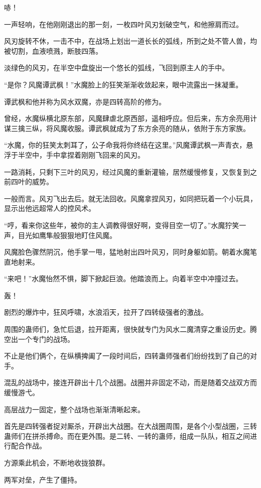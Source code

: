\begin{this_body}
哧！

一声轻响，在他刚刚退出的那一刻，一枚四叶风刃划破空气，和他擦肩而过。

风刃旋转不休，一击不中，在战场上划出一道长长的弧线，所到之处不管人兽，均被切割，血液喷溅，断肢四落。

淡绿色的风刃，在半空中盘旋出一个悠长的弧线，飞回到原主人的手中。

“是你？风魔谭武枫！”水魔脸上的狂笑渐渐收敛起来，眼中流露出一抹凝重。

谭武枫和他并称为风水双魔，亦是四转高阶的修为。

曾经，水魔纵横北原东部，风魔肆虐北原西部，遥相呼应。但后来，东方余亮用计谋三擒三纵，将风魔收服。谭武枫就成为了东方余亮的随从，依附于东方家族。

“水魔，你的狂笑太刺耳了，公子命我将你终结在这里。”风魔谭武枫一声青衣，悬浮于半空中，手中拿捏着刚刚飞回来的风刃。

一路消耗，只剩下三叶的风刃，经过风魔的重新灌输，居然缓慢修复，又恢复到之前四叶的威势。

一般而言。风刃飞出去后。就无法回收。风魔拿捏风刃，如同把玩着一个小玩具，显示出他远超常人的控风术。

“哼，看来你这些年，被你的主人调教得很好啊，变得目空一切了。”水魔狞笑一声，目光如鹰隼般狠狠地盯住风魔。

风魔脸色骤然阴沉，他手掌一甩，猛地射出四叶风刃，同时身躯如箭。朝着水魔笔直地射来。

“来吧！”水魔怡然不惧，脚下掀起巨浪。他踏浪而上。向着半空中冲撞过去。

轰！

剧烈的爆炸中，狂风呼啸，水浪滔天，拉开了四转级强者的激战。

周围的蛊师们，急忙后退，拉开距离，很快就专门为风水二魔清穿之重设历史。腾空出一个专门的战场。

不止是他们俩个，在纵横捭阖了一段时间后，四转蛊师强者们纷纷找到了自己的对手。

混乱的战场中，接连开辟出十几个战圈。战圈并非固定不动，而是随着交战双方而缓慢游弋。

高层战力一固定，整个战场也渐渐清晰起来。

首先是四转强者捉对厮杀，开辟出大战圈。在大战圈周围，是各个小型战圈，三转蛊师们在拼杀搏命。而在更外围。是二转、一转的蛊师，组成一队队，相互之间进行配合作战。

方源乘此机会，不断地收拢狼群。

两军对垒，产生了僵持。


\end{this_body}
